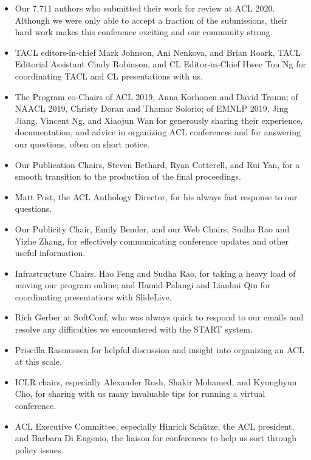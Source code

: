 \documentclass[11pt]{article}
\begin{document}
\begin{itemize}
\item Our 7,711 authors who submitted their work for review at ACL 2020. Although we were only able to accept a fraction of the submissions, their hard work makes this conference exciting and our community strong.

\item TACL editors-in-chief Mark Johnson, Ani Nenkova, and Brian Roark, TACL Editorial
Assistant Cindy Robinson, and CL Editor-in-Chief Hwee Tou Ng for coordinating TACL and CL presentations with us. 

\item The Program co-Chairs of ACL 2019, Anna Korhonen and David Traum; of NAACL 2019, Christy Doran and Thamar Solorio; of EMNLP 2019, Jing Jiang, Vincent Ng, and Xiaojun Wan for generously sharing their experience, documentation, and advice in organizing ACL conferences and for answering our questions, often on short notice.  

\item Our Publication Chairs, Steven Bethard, Ryan Cotterell, and Rui Yan, for a smooth transition to the production of the final proceedings.

\item Matt Post, the ACL Anthology Director, for his always fast response to our questions. 

\item Our Publicity Chair, Emily Bender, and our Web Chairs, Sudha Rao and Yizhe Zhang, for effectively communicating conference updates and other useful information.

\item Infrastructure Chairs, Hao Feng and Sudha Rao, for taking a heavy load of moving our program online; and Hamid Palangi and Lianhui Qin for coordinating presentations with SlideLive. 

\item Rich Gerber at SoftConf, who was always quick to respond to our emails and resolve any difficulties we encountered with the START system. 

\item Priscilla Rasmussen for helpful discussion and insight into organizing an ACL at this scale. 

\item ICLR chairs, especially  Alexander Rush, Shakir Mohamed, and Kyunghyun Cho, for sharing with us many invaluable tips for running a virtual conference. 

\item ACL Executive Committee, especially Hinrich Schütze, the ACL president, and Barbara Di Eugenio, the liaison for conferences to help us sort through policy issues.


\end{itemize}
\end{document}
